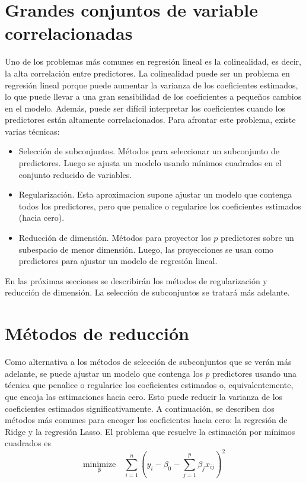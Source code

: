 \section{Grandes conjuntos de variable correlacionadas}

Uno de los problemas más comunes en regresión lineal es la colinealidad, es decir, la alta correlación entre predictores. La colinealidad puede ser un problema en regresión lineal porque puede aumentar la varianza de los coeficientes estimados, lo que puede llevar a una gran sensibilidad de los coeficientes a pequeños cambios en el modelo. Además, puede ser difícil interpretar los coeficientes cuando los predictores están altamente correlacionados. Para afrontar este problema, existe varias técnicas: 

\begin{itemize}
    \item Selección de subconjuntos. Métodos para seleccionar un subconjunto de predictores. Luego se ajusta un modelo usando mínimos cuadrados en el conjunto reducido de variables.
    \item Regularización. Esta aproximacion supone ajustar un modelo que contenga todos los predictores, pero que penalice o regularice los coeficientes estimados (hacia cero).
    \item Reducción de dimensión. Métodos para proyector los $p$ predictores sobre un subespacio de menor dimensión. Luego, las proyecciones se usan como predictores para ajustar un modelo de regresión lineal.
\end{itemize}

En las próximas secciones se describirán los métodos de regularización y reducción de dimensión. La selección de subconjuntos se tratará más adelante. 


\section{Métodos de reducción}

Como alternativa a los métodos de selección de subconjuntos que se verán más adelante, se puede ajustar un modelo que contenga los $p$ predictores usando una técnica que penalice o regularice los coeficientes estimados o, equivalentemente, que encoja las estimaciones hacia cero. Esto puede reducir la varianza de los coeficientes estimados significativamente. A continuación, se describen dos métodos más comunes para encoger los coeficientes hacia cero: la regresión de Ridge y la regresión Lasso. El problema que resuelve la estimación por mínimos cuadrados es 
\begin{equation}
\underset{\boldsymbol{\beta}}{\text{minimize}} \quad \sum_{i=1}^{n}\left(y_i - \beta_0 - \sum_{j=1}^{p}\beta_j x_{ij}\right)^2
\end{equation}

